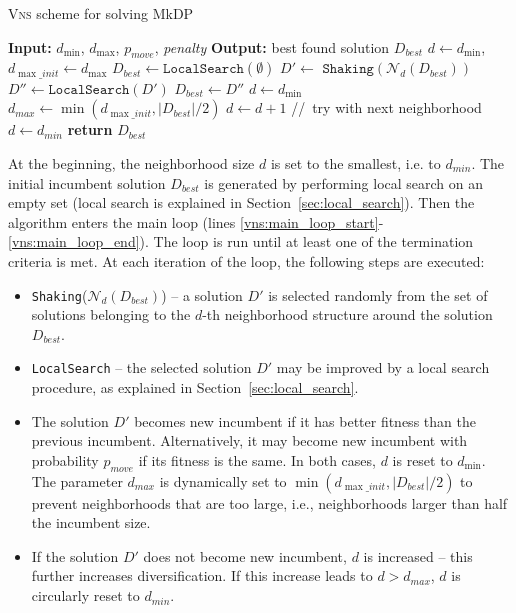 \documentclass[dvipsnames,format=sigconf]{acmart} %
\begin{document}
     \begin{algorithm}[!t] 
     	\scriptsize
  	\caption{\textsc{Vns} scheme for solving MkDP}\label{alg:vns}
  	\begin{algorithmic}[1]
  		\STATE \textbf{Input:} $d_{\min}$, $d_{\max}$, $p_{move}$, \emph{penalty}
  		\STATE \textbf{Output:} best found solution $D_{best}$
  		\STATE $d \gets  d_{\min}$, $d_{\max\_init} \gets d_{\max}$
  		\STATE  $D_{best} \gets \texttt{LocalSearch}(\emptyset)$ \label{vns:init}
  		  \label{vns:main_loop_start}
  		\STATE  $D' \gets$  $\texttt{Shaking}(\mathcal{N}_d(D_{best}))$
  		\STATE $D'' \gets  \texttt{LocalSearch}(D')$
  		 \label{line:acceptance_incumbent_cond}
  	    \STATE $D _{best}\gets D''$
  	    \STATE $d \gets d_{\min}$
  	 	\STATE  $d_{max} \gets \min(d_{\max\_init}, |D_{best}|/2)$  \label{vns:implicit_bound}
  		\ELSE 
  		\STATE $d \gets d + 1$ \hspace{0.3cm}//\, try with next neighborhood
  		\STATE $d\gets d_{min}$
  		\ENDIF
  		\ENDIF
  		\ENDWHILE \label{vns:main_loop_end}
  		\STATE \textbf{return} $D_{best}$
  	\end{algorithmic}
  \end{algorithm}

  At the beginning, the neighborhood size $d$ is set to the smallest, i.e. to $d_{min}$. 
  The initial incumbent solution $D_{best}$ is generated by performing local search on an empty set (local search is explained in Section~\ref{sec:local_search}).  
  Then the algorithm enters the main loop (lines \ref{vns:main_loop_start}-\ref{vns:main_loop_end}). The loop is run until at least one of the termination criteria is met. At each iteration of the loop, the following steps are executed: 
  
  \begin{itemize}
  	\item \texttt{Shaking}($\mathcal{N}_d(D_{best})$) -- a solution $D'$ is selected   randomly from the set of solutions belonging to the $d$-th neighborhood structure around the solution $D_{best}$.
  	\item  \texttt{LocalSearch} -- the selected solution $D'$ may be improved by a local search procedure, as explained in Section~\ref{sec:local_search}.
  	\item The solution $D'$ becomes new incumbent if it has better fitness than the previous incumbent. Alternatively, it may become new incumbent with probability $p_{move}$ if its fitness is the same. In both cases, $d$ is reset to $d_{\min}$. The parameter $d_{max}$ is dynamically set to $\min(d_{\max\_init}, |D_{best}|/2)$ to prevent neighborhoods that are too large, i.e., neighborhoods larger than half  the incumbent size. 
  	\item  If the solution $D'$ does not become new incumbent, $d$ is increased -- this further increases diversification. If this increase leads to $d> d_{max}$, $d$ is circularly reset to $d_{min}$.
   \end{itemize}
    
\end{document}
